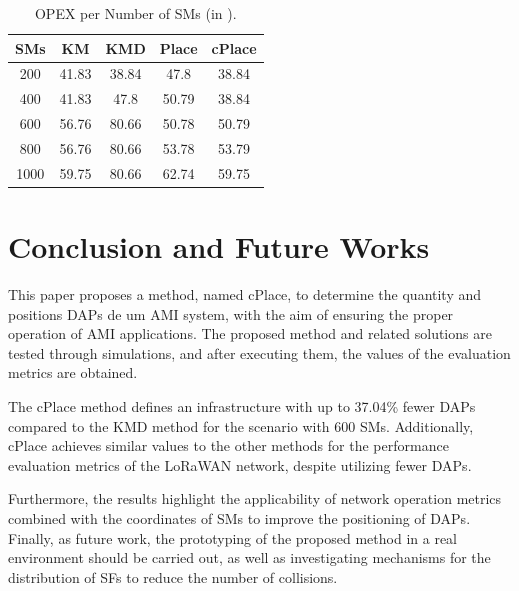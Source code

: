 \documentclass[a4paper,fleqn]{cas-dc}
\begin{document}
\begin{table}[ht]
    \centering
    \caption{\gls{OPEX} per Number of \gls{SMs} (in ).}
    \begin{tabular}{ccccc}
        \hline \hline
        \gls{SMs} &  KM & KMD & Place & cPlace \\ \hline
        200      &  41.83 &  38.84 & 47.8 & 38.84 \\
        400      &  41.83 &  47.8 & 50.79 & 38.84 \\
        600      &  56.76 &  80.66 & 50.78 & 50.79 \\ 
        800      &  56.76 &  80.66 & 53.78 & 53.79 \\ 
        1000     &  59.75 &  80.66 & 62.74 & 59.75 \\ \hline \hline
    \end{tabular}
    \label{tab:opex}
\end{table}

\section{Conclusion and Future Works} \label{sec:conclusion}

This paper proposes a method, named cPlace, to determine the quantity and positions \gls{DAPs} de um \gls{AMI} system, with the aim of ensuring the proper operation of \gls{AMI} applications. The proposed method and related solutions are tested through simulations, and after executing them, the values of the evaluation metrics are obtained.

The cPlace method defines an infrastructure with up to 37.04\% fewer \gls{DAPs} compared to the KMD method for the scenario with 600 \gls{SMs}. Additionally, cPlace achieves similar values to the other methods for the performance evaluation metrics of the LoRaWAN network, despite utilizing fewer \gls{DAPs}.

Furthermore, the results highlight the applicability of network operation metrics combined with the coordinates of \gls{SMs} to improve the positioning of \gls{DAPs}. Finally, as future work, the prototyping of the proposed method in a real environment should be carried out, as well as investigating mechanisms for the distribution of SFs to reduce the number of collisions.
\end{document}
